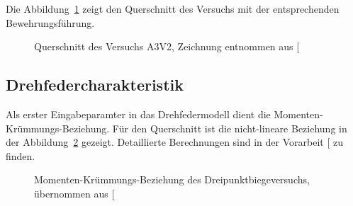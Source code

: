 \documentclass[
  10pt,
  letterpaper,
]{scrreprt}
\begin{document}
Die Abbildung~\ref{fig-qs_a3v2} zeigt den Querschnitt des Versuchs mit
der entsprechenden Bewehrungsführung.

\begin{figure}[H]


\caption{\label{fig-qs_a3v2}Querschnitt des Versuchs A3V2, Zeichnung
entnommen aus {[}\citeproc{ref-gitz_ansatze_2024}{1}{]}}

\end{figure}%

\subsection{Drehfedercharakteristik}\label{drehfedercharakteristik}

Als erster Eingabeparamter in das Drehfedermodell dient die
Momenten-Krümmungs-Beziehung. Für den Querschnitt ist die nicht-lineare
Beziehung in der Abbildung~\ref{fig-mchi_a3v2} gezeigt. Detaillierte
Berechnungen sind in der Vorarbeit
{[}\citeproc{ref-gitz_ansatze_2024}{1}{]} zu finden.

\begin{figure}[H]


\caption{\label{fig-mchi_a3v2}Momenten-Krümmungs-Beziehung des
Dreipunktbiegeversuchs, übernommen aus
{[}\citeproc{ref-gitz_ansatze_2024}{1}{]}}

\end{figure}%
\end{document}

